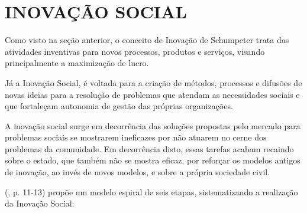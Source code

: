 \section {INOVAÇÃO SOCIAL}
\label{inovacaosocial}

Como visto na seção anterior, o conceito de Inovação de Schumpeter trata das atividades inventivas para novos processos, produtos e serviços, visando principalmente a maximização de lucro. 

Já a Inovação Social, é voltada para a criação de métodos, processos e difusões de novas ideias para a resolução de problemas que atendam as necessidades sociais e que fortaleçam autonomia de gestão das próprias organizações. \cite{monteiro2019}

A inovação social surge em decorrência das soluções propostas pelo mercado para problemas sociais se mostrarem ineficazes por não atuarem no cerne dos problemas da comunidade. Em decorrência disto, essas tarefas acabam recaindo sobre o estado, que também não se mostra eficaz, por reforçar os modelos antigos de inovação, ao invés de novos modelos, e sobre a própria sociedade civil. \cite{murray2010}

\citeauthor{murray2010} (\citeyear{murray2010}, p. 11-13) propõe um modelo espiral de seis etapas, sistematizando a realização da Inovação Social:



